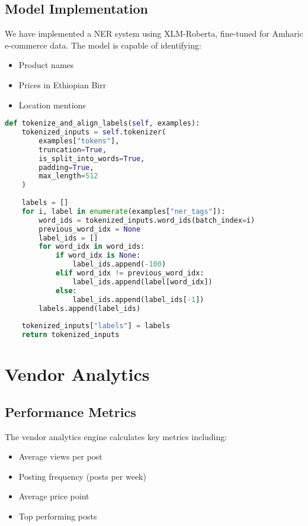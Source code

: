 \documentclass[12pt,a4paper]{article}
\begin{document}
\subsection{Model Implementation}
We have implemented a NER system using XLM-Roberta, fine-tuned for Amharic e-commerce data. The model is capable of identifying:
\begin{itemize}
    \item Product names
    \item Prices in Ethiopian Birr
    \item Location mentions
\end{itemize}

\begin{lstlisting}[language=Python, caption=NER Model Implementation]
def tokenize_and_align_labels(self, examples):
    tokenized_inputs = self.tokenizer(
        examples["tokens"],
        truncation=True,
        is_split_into_words=True,
        padding=True,
        max_length=512
    )
    
    labels = []
    for i, label in enumerate(examples["ner_tags"]):
        word_ids = tokenized_inputs.word_ids(batch_index=i)
        previous_word_idx = None
        label_ids = []
        for word_idx in word_ids:
            if word_idx is None:
                label_ids.append(-100)
            elif word_idx != previous_word_idx:
                label_ids.append(label[word_idx])
            else:
                label_ids.append(label_ids[-1])
        labels.append(label_ids)
    
    tokenized_inputs["labels"] = labels
    return tokenized_inputs
\end{lstlisting}

\section{Vendor Analytics}

\subsection{Performance Metrics}
The vendor analytics engine calculates key metrics including:
\begin{itemize}
    \item Average views per post
    \item Posting frequency (posts per week)
    \item Average price point
    \item Top performing posts
\end{itemize}
\end{document}
